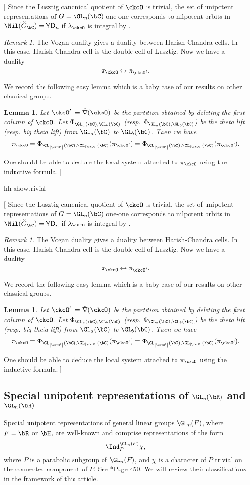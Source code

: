 \documentclass[12pt,a4paper]{amsart}
\newcommand{\trivial}[2][]{\if\relax\detokenize{#1}\relax
  {%
      \color{orange} \vspace{0em} $[$  #2 $]$
      \color{black}
  }
  \else
\ifx#1h
\ifcsname showtrivial\endcsname
{%
    \color{orange} \vspace{0em}  $[$ #2 $]$
    \color{black}
}
\fi
\else {\red Wrong argument!} \fi
\fi
}
\def\abs#1{\left|{#1}\right|}
\def\DDD{{\check\nabla}}
\numberwithin{equation}{section}
\newtheorem{lem}[thm]{Lemma}
\theoremstyle{remark}
\newtheorem{remark}[thm]{Remark}
\def\half{{\tfrac{1}{2}}}
\def\ckGc{\check{G}_{\bC}}
\def\YD{\mathsf{YD}}
\def\lamck{\lambda_\ckcO}
\begin{document}


\trivial[h]{
Since the Lusztig canonical quotient of $\ckcO$ is trivial, the set of unipotent representations
of $G = \GL_n(\bC)$ one-one corresponds to nilpotent orbits in
$\Nil(\ckGc) = \YD_{n}$ if $\lamck$ is integral by
\cite{BVUni}.


\begin{remark}
The Vogan duality gives a duality between Harish-Chandra cells.
In this case, Harish-Chandra cell is the double cell
of Lusztig.
Now we have a duality
\[
 \pi_\ckcO \leftrightarrow \pi_{\ckcO^t}.
\]
\end{remark}

We record the following easy lemma which is a baby case of our results on other
classical groups.
\begin{lem}
  Let $\ckcO' := \DDD(\ckcO)$ be the partition obtained by deleting the first
  column of $\ckcO$. Let $\Phi_{\GL_{a}(\bC),\GL_{b}(\bC)}$ (resp.
  $\Phi_{\GL_{a}(\bC),\GL_{b}(\bC)}$) be the theta lift (resp. big theta lift)
  from $\GL_a(\bC)$ to $\GL_b(\bC)$. Then we have
  \[
    \pi_{\ckcO} = \Phi_{\GL_{\abs{\ckcO'}}(\bC),\GL_{\abs{\ckcO}}(\bC)} (\pi_{\ckcO'})= \Phi_{\GL_{\abs{\ckcO'}}(\bC),\GL_{\abs{\ckcO}}(\bC)} (\pi_{\ckcO'}).
  \]
\end{lem}

One should be able to deduce the local system attached to $\pi_{\ckcO}$ using
the inductive formula.
}

\subsection{Special unipotent representations of $\GL_n(\bR)$ and $\GL_n(\bH)$}\label{sec:GLRH}


Special unipotent representations of general linear groups $\GL_{n}(F)$, where $F= \bR$ or $\bH$, are well-known and comprise
representations of the form
\[
  \Ind_{P}^{\GL_{n}(F)}\chi,
\]
where $P$ is a parabolic subgroup of $\GL_{n}(F)$,
and $\chi$ is a character of $P$ trivial on the connected component of $P$. See \cite{V.GL}*{Page 450}. We will review their classifications in the framework of this article.


\end{document}

